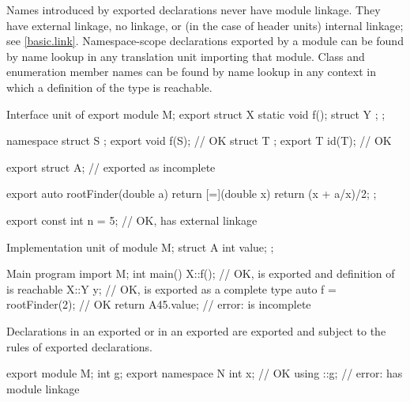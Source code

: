 \pnum
\begin{note}
Names introduced by exported declarations never have module linkage.
They have external linkage, no linkage, or
(in the case of header units) internal linkage; see \ref{basic.link}.
Namespace-scope declarations exported by a module can be found by name lookup
in any translation unit importing that module.
Class and enumeration member names can be found by name lookup in any
context in which a definition of the type is reachable.
\end{note}
\begin{example}
\begin{codeblocktu}{Interface unit of }
export module M;
export struct X {
  static void f();
  struct Y { };
};

namespace {
  struct S { };
}
export void f(S);               // OK
struct T { };
export T id(T);                 // OK

export struct A;                //  exported as incomplete

export auto rootFinder(double a) {
  return [=](double x) { return (x + a/x)/2; };
}

export const int n = 5;         // OK,  has external linkage
\end{codeblocktu}

\begin{codeblocktu}{Implementation unit of }
module M;
struct A {
  int value;
};
\end{codeblocktu}

\begin{codeblocktu}{Main program}
import M;
int main() {
  X::f();                       // OK,  is exported and definition of  is reachable
  X::Y y;                       // OK,  is exported as a complete type
  auto f = rootFinder(2);       // OK
  return A{45}.value;           // error:  is incomplete
}
\end{codeblocktu}
\end{example}

\pnum
\begin{note}
Declarations in an exported 
or in an exported 
are exported and subject to the rules of exported declarations.
\begin{example}
\begin{codeblock}
export module M;
int g;
export namespace N {
  int x;                        // OK
  using ::g;                    // error:  has module linkage
}
\end{codeblock}
\end{example}
\end{note}

